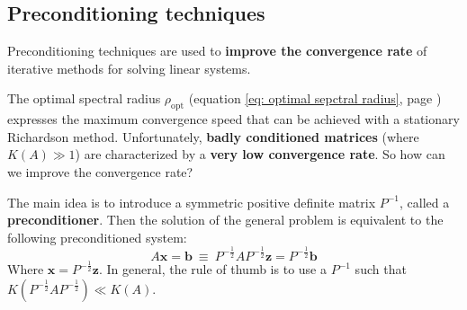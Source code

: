 \subsection{Preconditioning techniques}

Preconditioning techniques are used to \textbf{improve the convergence rate} of iterative methods for solving linear systems.

\highspace
The optimal spectral radius $\rho_{\text{opt}}$ (equation \ref{eq: optimal sepctral radius}, page \pageref{eq: optimal sepctral radius}) expresses the maximum convergence speed that can be achieved with a stationary Richardson method. Unfortunately, \textbf{badly conditioned matrices} (where $K\left(A\right) \gg 1$) are characterized by a \textbf{very low convergence rate}. So how can we improve the convergence rate?

\highspace
The main idea is to introduce a symmetric positive definite matrix $P^{-1}$, called a \textbf{preconditioner}. Then the solution of the general problem is equivalent to the following preconditioned system:
\begin{equation}
    A\mathbf{x} = \mathbf{b} \: \equiv \: P^{-\frac{1}{2}} A P^{-\frac{1}{2}} \mathbf{z} = P^{-\frac{1}{2}} \mathbf{b}
\end{equation}
Where $\mathbf{x} = P^{-\frac{1}{2}}\mathbf{z}$. In general, the rule of thumb is to use a $P^{-1}$ such that $K\left(P^{-\frac{1}{2}} A P^{-\frac{1}{2}}\right) \ll K\left(A\right)$.

